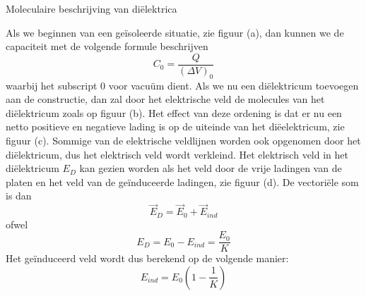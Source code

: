 \begin{app}{Moleculaire beschrijving van diëlektrica}
    \vspace{-0.5cm}
    \begin{minipage}{.75\textwidth}
        Als we beginnen van een geïsoleerde situatie, zie figuur (a), dan kunnen we de capaciteit met de volgende formule beschrijven
        \begin{equation*}
            C_0 = \dfrac{Q}{(\Delta V)_0}
        \end{equation*}
        \noindent waarbij het subscript $0$ voor vacuüm dient. Als we nu een diëlektricum toevoegen aan de constructie, dan zal door het elektrische veld de molecules van het diëlektricum zoals op figuur (b). Het effect van deze ordening is dat er nu een netto positieve en negatieve lading is op de uiteinde van het diëelektricum, zie figuur (c). Sommige van de elektrische veldlijnen worden ook opgenomen door het diëlektricum, dus het elektrisch veld wordt verkleind. Het elektrisch veld in het diëlektricum $E_D$ kan gezien worden als het veld door de vrije ladingen van de platen en het veld van de geïnduceerde ladingen, zie figuur (d). De vectoriële som is dan
        \begin{equation*}
            \Vec{E}_D = \Vec{E}_0 + \Vec{E}_{ind}
        \end{equation*}
        ofwel
        \begin{equation*}
            E_D = E_0 - E_{ind} = \dfrac{E_0}{K}
        \end{equation*}
        Het geïnduceerd veld wordt dus berekend op de volgende manier:
        \begin{equation*}
            E_{ind} = E_0(1-\dfrac{1}{K})
        \end{equation*}
    \end{minipage}
    \hspace{0.5cm}
    \begin{minipage}{.18\textwidth}

\end{minipage}
\end{app}
